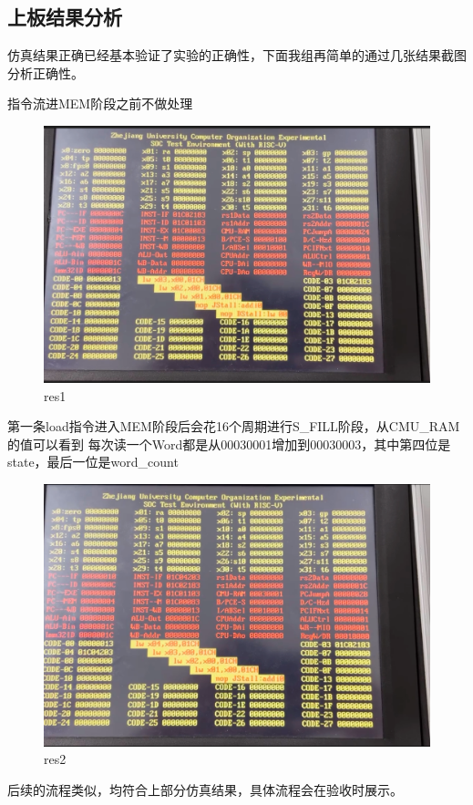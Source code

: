 \subsection{上板结果分析}
仿真结果正确已经基本验证了实验的正确性，下面我组再简单的通过几张结果截图分析正确性。

指令流进MEM阶段之前不做处理
\begin{figure} [H]
    \centering
    \includegraphics[width=1.0\textwidth]{figs/res1.png}
    \caption{res1}
    \label{Fig.14}
\end{figure}

第一条load指令进入MEM阶段后会花16个周期进行S\_FILL阶段，从CMU\_RAM的值可以看到
每次读一个Word都是从00030001增加到00030003，其中第四位是state，最后一位是word\_count

\begin{figure}[H]
    \centering
    \includegraphics[width=1.0\textwidth]{figs/res2.png}
    \caption{res2}
    \label{Fig.15}
\end{figure}

后续的流程类似，均符合上部分仿真结果，具体流程会在验收时展示。
